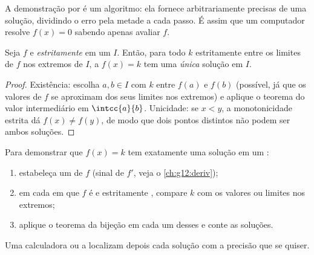 \begin{remark}
A demonstração por  é um algoritmo: ela fornece 
arbitrariamente precisas de uma solução, dividindo o erro pela metade a
cada passo. É assim que um computador resolve $f(x) = 0$ sabendo apenas
avaliar $f$.
\end{remark}

\begin{theorem}\label{thm:g12:limcont:bijection}
Seja $f$  e \emph{estritamente } em um  $I$.
Então, para todo $k$ estritamente entre os limites de $f$ nos extremos de
$I$, a  $f(x) = k$ tem uma \emph{única} solução em $I$.
\end{theorem}

\begin{proof}
Existência: escolha $a, b \in I$ com $k$ entre $f(a)$ e $f(b)$ (possível,
já que os valores de $f$ se aproximam dos seus limites nos extremos) e
aplique o teorema do valor intermediário em $\intcc{a}{b}$. Unicidade: se
$x < y$, a monotonicidade estrita dá $f(x) \neq f(y)$, de modo que dois
pontos distintos não podem ser ambos soluções.
\end{proof}

\begin{method}[Resolver $f(x) = k$ com o teorema da bijeção]\label{met:g12:limcont:bijection}
Para demonstrar que $f(x) = k$ tem exatamente uma solução em um
:
\begin{enumerate}
  \item estabeleça um  de $f$ (sinal de $f'$, veja o
        \cref{ch:g12:deriv});
  \item em cada  em que $f$ é  e estritamente ,
        compare $k$ com os valores ou limites nos extremos;
  \item aplique o teorema da bijeção em cada um desses  e conte
        as soluções.
\end{enumerate}
Uma calculadora ou a  localizam depois cada solução com a
precisão que se quiser.
\end{method}

